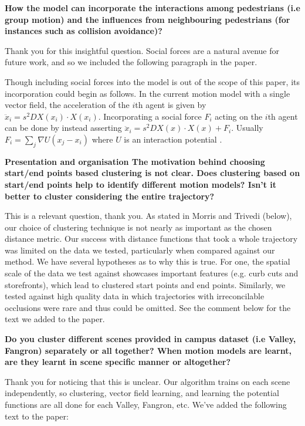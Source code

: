 \documentclass[usenames,dvipsnames]{article}
\providecommand{\response}[1]{
\noindent
\noindent\colorbox{gray!20}{
\parbox{\textwidth}{
\setlength{\parskip}{.1in}
\setlength{\parindent}{.1in}
#1}
}
}
\begin{document}
\begin{enumerate}
\begin{item}
\textbf{How the model can incorporate the interactions among pedestrians (i.e
group motion) and the influences from neighbouring pedestrians (for
instances such as collision avoidance)?}
\end{item}
Thank you for this insightful question. Social forces are a natural avenue for future work, and so we included the following paragraph in the paper.

\response{Though including social forces into the model is out of the scope of this paper, its incorporation could begin as follows.  In the current motion model with a single vector field, the acceleration of the $i$th agent is given by $\ddot{x}_i = s^2 DX(x_i) \cdot X(x_i)$.  Incorporating a social force $F_{i}$ acting on the $i$th agent can be done by instead asserting $\ddot{x}_i = s^2 DX(x) \cdot X(x) + F_i$.  Usually $F_{i} = \sum_{j} \nabla U( x_j - x_i)$ where $U$ is an interaction potential \cite{Helbing1995} .}


\begin{item}
\textbf{Presentation and organisation
The motivation behind choosing start/end points based clustering is not
clear. Does clustering based on start/end points help to identify
different motion models? Isn't it better to cluster considering the
entire trajectory? }
\end{item}
This is a relevant question, thank you. As stated in Morris and Trivedi (below), our choice of clustering technique is not nearly as important as the chosen distance metric. Our success with distance functions that took a whole trajectory was limited on the data we tested, particularly when compared against our method. We have several hypotheses as to why this is true.  For one, the spatial scale of the data we test against showcases important features (e.g. curb cuts and storefronts), which lead to clustered start points and end points. Similarly, we tested against high quality data in which trajectories with irreconcilable occlusions were rare and thus could be omitted. See the comment below for the text we added to the paper.



\begin{item}
\textbf{Do you cluster different scenes provided in campus dataset \cite{Alahi2016} (i.e
Valley, Fangron) separately or all together? When motion models are
learnt, are they learnt in scene specific manner or altogether?}
\end{item}
Thank you for noticing that this is unclear. Our algorithm trains on each scene independently, so clustering, vector field learning, and learning the potential functions are all done for each Valley, Fangron, etc. We've added the following text to the paper:


\end{enumerate}
\end{document}
